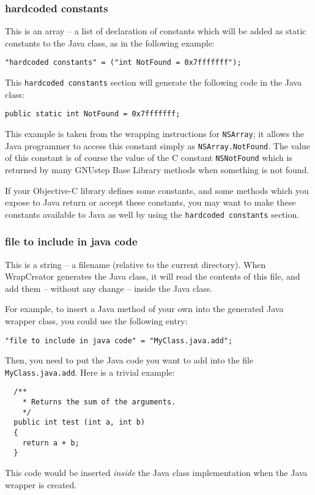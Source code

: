 \subsubsection{hardcoded constants}
This is an array -- a list of declaration of constants which will be
added as static constants to the Java class, as in the following
example:
\begin{verbatim}
"hardcoded constants" = ("int NotFound = 0x7fffffff");
\end{verbatim}
This \texttt{hardcoded constants} section will generate the following
code in the Java class:
\begin{verbatim}
public static int NotFound = 0x7fffffff;
\end{verbatim}
This example is taken from the wrapping instructions for
\texttt{NSArray}; it allows the Java programmer to access this
constant simply as \texttt{NSArray.NotFound}.  The value of this
constant is of course the value of the C constant \texttt{NSNotFound}
which is returned by many GNUstep Base Library methods when something
is not found.

If your Objective-C library defines some constants, and some methods
which you expose to Java return or accept these constants, you may
want to make these constants available to Java as well by using the
\texttt{hardcoded constants} section.

\subsubsection{file to include in java code}
This is a string -- a filename (relative to the current directory).
When WrapCreator generates the Java class, it will read the contents
of this file, and add them -- without any change -- inside the Java
class.

For example, to insert a Java method of your own into the generated 
Java wrapper class, you could use the following entry:
\begin{verbatim}
"file to include in java code" = "MyClass.java.add";
\end{verbatim}
Then, you need to put the Java code you want to add into the file
\texttt{MyClass.java.add}.  Here is a trivial example:
\begin{verbatim}
  /**
    * Returns the sum of the arguments.
    */
  public int test (int a, int b)
  {
    return a + b;
  }
\end{verbatim}
This code would be inserted {\em inside} the Java class implementation 
when the Java wrapper is created.

